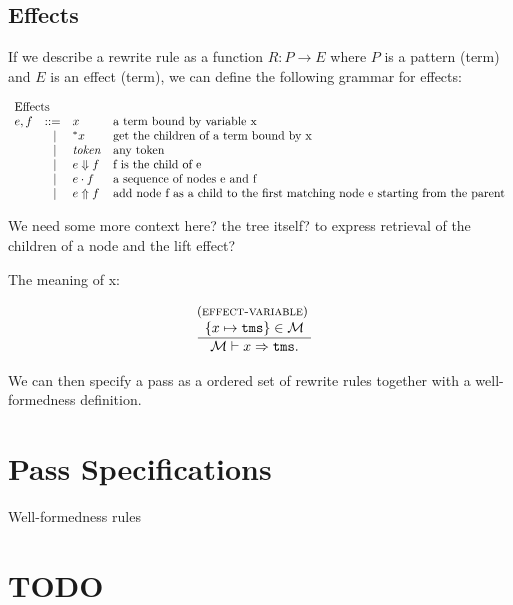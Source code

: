 \documentclass{article}
\newcommand{\rulename}{\textsc}
\newcommand{\irule}[3]{\begin{array}{l}{~\small\mbox{(\rulename{#1})}}\\\;\frac{\begin{array}{c}#2\end{array}}{\begin{array}{l}#3\end{array}}\end{array}}
\newcommand{\tok}{\ensuremath{\mathit{token}}} %
\newcommand{\tms}{\ensuremath{\mathtt{tms}}}
\newcommand{\bindings}{\ensuremath{\mathcal{M}}}
\newcommand{\pseq}[2]{\ensuremath{#1 \cdot #2}}
\newcommand{\children}[2]{\ensuremath{#1} \Downarrow #2}
\newcommand{\getchildren}[1]{\ensuremath{^*#1}}
\newcommand{\lift}[2]{\ensuremath{#1} \Uparrow #2}
\newcommand{\arrayheading}[2]{\multicolumn{#1}{l}{\mbox{#2}}}
\begin{document}
\subsection{Effects}

If we describe a rewrite rule as a function $R : P \to E$ where $P$ is a pattern (term) and $E$ is an effect (term), we can define the following grammar for effects:

\[
  \begin{array}{crll}
    \arrayheading{4}{Effects}\\
      e,f & ::= & x             & \text{a term bound by variable x}   \\
        & ~|~ & \getchildren{x} & \text{get the children of a term bound by x } \\
        & ~|~ & \tok            & \text{any token} \\
        & ~|~ & \children{e}{f} & \text{f is the child of e}  \\
        & ~|~ & \pseq{e}{f}     & \text{a sequence of nodes e and f}   \\
        & ~|~ & \lift{e}{f}     & \text{add node f as a child to the first matching node e starting from the parent} \\
  \end{array}
\]

We need some more context here? the tree itself? to express retrieval of the children of a node and the lift effect?

The meaning of x:

\[
  \begin{array}{c}
    \irule{effect-variable}{
    \{x \mapsto \tms\} \in \bindings
    }{
    \bindings \vdash x \Rightarrow \tms.  
    }
    \quad
  \end{array}
\]

We can then specify a pass as a ordered set of rewrite rules together with a well-formedness definition.


\section{Pass Specifications}

Well-formedness rules

\section*{TODO}
\end{document}
